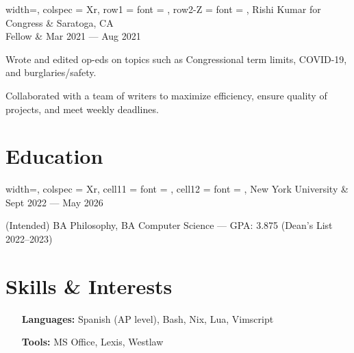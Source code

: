 \documentclass{article}
\begin{document}
\vspace{0.5em}

\begin{tblr}{
    width=\textwidth,
    colspec = {Xr},
    row{1} = {font = {\bfseries}},
    row{2-Z} = {font = {\itshape}},
  }
  Rishi Kumar for Congress & Saratoga, CA          \\
  Fellow                   & Mar 2021 --- Aug 2021
\end{tblr}
\begin{compactitem}
  \item
    Wrote and edited op-eds on topics such as Congressional term limits, COVID-19, and burglaries/safety.

  \item
    Collaborated with a team of writers to maximize efficiency, ensure quality of projects, and meet weekly deadlines.
\end{compactitem}

\vspace{0.5em}

\section{Education}
\titlerule

\vspace{0.5em}

\begin{tblr}{
    width=\textwidth,
    colspec = {Xr},
    cell{1}{1} = {font = {\bfseries}},
    cell{1}{2} = {font = {\itshape}},
  }
  New York University & Sept 2022 --- May 2026 \\
\end{tblr}
\begin{compactitem}
  \item
    (Intended) BA Philosophy, BA Computer Science --- GPA: 3.875 (Dean's List 2022--2023)
\end{compactitem}

\vspace{0.5em}

\section{Skills \& Interests}
\titlerule

\vspace{0.5em}

\begin{itemize}
  \item[\bfseries Languages:]
    Spanish (AP level), Bash, Nix, Lua, Vimscript

  \item[\bfseries Tools:]
    MS Office, Lexis, Westlaw
\end{itemize}
\end{document}
